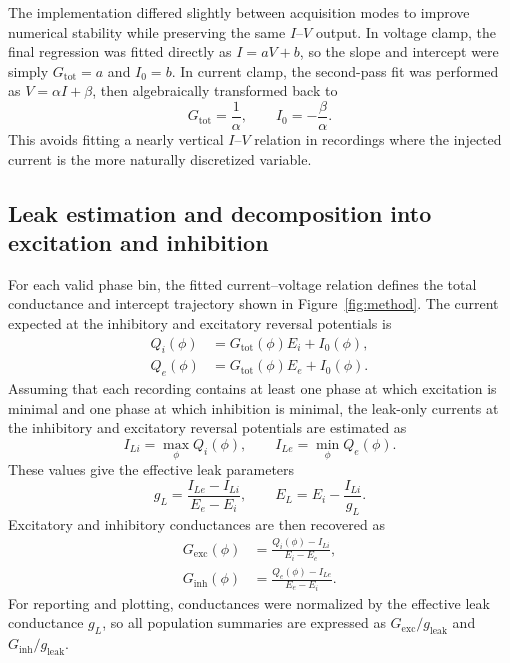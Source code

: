 \documentclass[11pt]{article}
\begin{document}
The implementation differed slightly between acquisition modes to improve numerical stability while preserving the same $I$--$V$ output. In voltage clamp, the final regression was fitted directly as $I=aV+b$, so the slope and intercept were simply $G_{\mathrm{tot}}=a$ and $I_0=b$. In current clamp, the second-pass fit was performed as $V=\alpha I+\beta$, then algebraically transformed back to
\begin{equation}
G_{\mathrm{tot}} = \frac{1}{\alpha}, \qquad I_0 = -\frac{\beta}{\alpha}.
\end{equation}
This avoids fitting a nearly vertical $I$--$V$ relation in recordings where the injected current is the more naturally discretized variable.

\subsection{Leak estimation and decomposition into excitation and inhibition}
For each valid phase bin, the fitted current--voltage relation defines the total conductance and intercept trajectory shown in Figure~\ref{fig:method}. The current expected at the inhibitory and excitatory reversal potentials is
\begin{align}
Q_i(\phi) &= G_{\mathrm{tot}}(\phi)E_i + I_0(\phi), \\
Q_e(\phi) &= G_{\mathrm{tot}}(\phi)E_e + I_0(\phi).
\end{align}
Assuming that each recording contains at least one phase at which excitation is minimal and one phase at which inhibition is minimal, the leak-only currents at the inhibitory and excitatory reversal potentials are estimated as
\begin{equation}
I_{Li} = \max_{\phi} Q_i(\phi), \qquad I_{Le} = \min_{\phi} Q_e(\phi).
\end{equation}
These values give the effective leak parameters
\begin{equation}
g_L = \frac{I_{Le}-I_{Li}}{E_e-E_i}, \qquad E_L = E_i - \frac{I_{Li}}{g_L}.
\end{equation}
Excitatory and inhibitory conductances are then recovered as
\begin{align}
G_{\mathrm{exc}}(\phi) &= \frac{Q_i(\phi)-I_{Li}}{E_i-E_e}, \\
G_{\mathrm{inh}}(\phi) &= \frac{Q_e(\phi)-I_{Le}}{E_e-E_i}.
\end{align}
For reporting and plotting, conductances were normalized by the effective leak conductance $g_L$, so all population summaries are expressed as $G_{\mathrm{exc}}/g_{\mathrm{leak}}$ and $G_{\mathrm{inh}}/g_{\mathrm{leak}}$.
\end{document}
